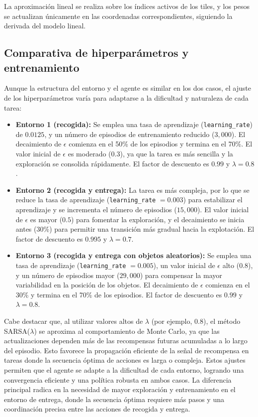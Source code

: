 \documentclass[a4paper,12pt]{article}
\begin{document}
La aproximación lineal se realiza sobre los índices activos de los tiles, y los pesos se actualizan únicamente en las coordenadas correspondientes, siguiendo la derivada del modelo lineal.
\subsection{Comparativa de hiperparámetros y entrenamiento}

Aunque la estructura del entorno y el agente es similar en los dos casos, el ajuste de los hiperparámetros varía para adaptarse a la dificultad y naturaleza de cada tarea:

\begin{itemize}
    \item \textbf{Entorno 1 (recogida):} Se emplea una tasa de aprendizaje (\texttt{learning\_rate}) de $0.0125$, y un número de episodios de entrenamiento reducido ($3{,}000$). El decaimiento de $\epsilon$ comienza en el 50\% de los episodios y termina en el 70\%. El valor inicial de $\epsilon$ es moderado ($0.3$), ya que la tarea es más sencilla y la exploración se consolida rápidamente. El factor de descuento es $0.99$ y $\lambda = 0.8$.
    \item \textbf{Entorno 2 (recogida y entrega):} La tarea es más compleja, por lo que se reduce la tasa de aprendizaje (\texttt{learning\_rate} $= 0.003$) para estabilizar el aprendizaje y se incrementa el número de episodios ($15{,}000$). El valor inicial de $\epsilon$ es mayor ($0.5$) para fomentar la exploración, y el decaimiento se inicia antes (30\%) para permitir una transición más gradual hacia la explotación. El factor de descuento es $0.995$ y $\lambda = 0.7$.
    \item \textbf{Entorno 3 (recogida y entrega con objetos aleatorios):} Se emplea una tasa de aprendizaje (\texttt{learning\_rate} $= 0.005$), un valor inicial de $\epsilon$ alto ($0.8$), y un número de episodios mayor ($29{,}000$) para compensar la mayor variabilidad en la posición de los objetos. El decaimiento de $\epsilon$ comienza en el 30\% y termina en el 70\% de los episodios. El factor de descuento es $0.99$ y $\lambda = 0.8$.
\end{itemize}

Cabe destacar que, al utilizar valores altos de $\lambda$ (por ejemplo, $0.8$), el método SARSA($\lambda$) se aproxima al comportamiento de Monte Carlo, ya que las actualizaciones dependen más de las recompensas futuras acumuladas a lo largo del episodio. Esto favorece la propagación eficiente de la señal de recompensa en tareas donde la secuencia óptima de acciones es larga o compleja.
Estos ajustes permiten que el agente se adapte a la dificultad de cada entorno, logrando una convergencia eficiente y una política robusta en ambos casos. La diferencia principal radica en la necesidad de mayor exploración y entrenamiento en el entorno de entrega, donde la secuencia óptima requiere más pasos y una coordinación precisa entre las acciones de recogida y entrega.
\end{document}
